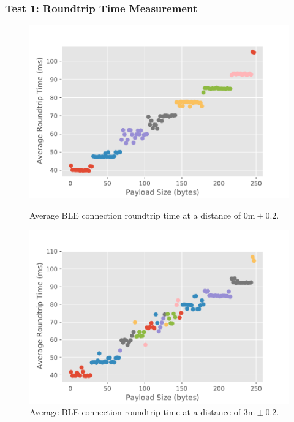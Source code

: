 \subsubsection{Test 1: Roundtrip Time Measurement}

\begin{figure}[H]
    \begin{minipage}[r]{0.49\linewidth}
    \centering
    \includegraphics[width=\linewidth]{images/ble-roundtrip-hci0-0cm.pdf}
    \caption[Average \acs{BLE} connection roundtrip time at a distance of 0m.]{Average \acs{BLE} connection roundtrip time at a distance of $0\text{m} \pm 0.2$.}
    \label{fig:ble-roundtrip-6cm}
    \end{minipage}
    \begin{minipage}[l]{0.49\linewidth}
        \centering
        \includegraphics[width=\linewidth]{images/ble-roundtrip-hci0-300cm.pdf}
        \caption[Average \acs{BLE} connection roundtrip time at a distance of 3m.]{Average \acs{BLE} connection roundtrip time at a distance of $3\text{m} \pm 0.2$.}
        \label{fig:ble-roundtrip-9cm}
        \end{minipage}
\end{figure}



